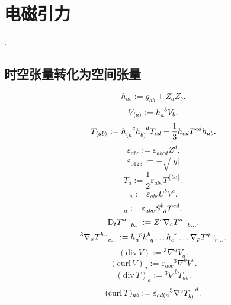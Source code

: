 \chapter{电磁引力}

\cite{Maartens2008}. 

\section{时空张量转化为空间张量}

\begin{equation}
    h_{ab}:=g_{ab}+Z_a Z_b.
\end{equation}
\begin{equation}
    V_{\langle a\rangle}:=h_a^{\ph{a}b}V_{b}.
\end{equation}
\begin{equation}
    T_{\langle ab\rangle}:=h_{(a}^{\ph{(a}c}h_{b)}^{\ph{b)}d}T_{cd}-\frac{1}{3}h_{cd}T^{cd}h_{ab}.
\end{equation}
\begin{equation}
    \varepsilon_{abc}:=\varepsilon_{abcd}Z^d.
\end{equation}
\begin{equation}
    \varepsilon_{0123}:=-\sqrt{\left\lvert g\right\rvert }
\end{equation}
\begin{equation}
    T_a:=\frac{1}{2}\varepsilon_{abc}T^{[bc]}.
\end{equation}
\begin{equation}
    [U,V]_a:=\varepsilon_{abc}U^bV^c.
\end{equation}
\begin{equation}
    [S,T]_a:=\varepsilon_{abc}S^b_{\ph{b}d}T^{cd}.
\end{equation}
\begin{equation}
    \text{D}_tT^{a\dots}_{\ph{a\dots}b\dots}:=Z^c\nabla_c T^{a\dots}_{\ph{a\dots}b\dots}.
\end{equation}
\begin{equation}
    {}^3\nabla_a T^{b\dots}_{\ph{b\dots}c\dots}:=h_a^{\ph{a}p}h^b_{\ph{b}q}\dots h_c^{\ph{c}r}\dots\nabla_p T^{q\dots}_{\ph{q\dots}r\dots}.
\end{equation}
\begin{equation}
    (\text{div}\,V):={}^3\nabla^aV_a.
\end{equation}
\begin{equation}
    (\text{curl}\,V)_a:=\varepsilon_{abc}{}^3\nabla^bV^c.
\end{equation}
\begin{equation}
    (\text{div}\,T)_a:={}^3\nabla^bT_{ab}.
\end{equation}
\begin{equation}
    (\text{curl}\,T)_{ab}:=\varepsilon_{cd(a}{}^3\nabla^cT_{b)}^{\ph{b)}d}.
\end{equation}


